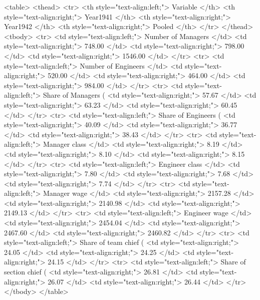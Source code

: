 <table>
 <thead>
  <tr>
   <th style="text-align:left;"> Variable </th>
   <th style="text-align:right;"> Year1941 </th>
   <th style="text-align:right;"> Year1942 </th>
   <th style="text-align:right;"> Pooled </th>
  </tr>
 </thead>
<tbody>
  <tr>
   <td style="text-align:left;"> Number of Managers </td>
   <td style="text-align:right;"> 748.00 </td>
   <td style="text-align:right;"> 798.00 </td>
   <td style="text-align:right;"> 1546.00 </td>
  </tr>
  <tr>
   <td style="text-align:left;"> Number of Engineers </td>
   <td style="text-align:right;"> 520.00 </td>
   <td style="text-align:right;"> 464.00 </td>
   <td style="text-align:right;"> 984.00 </td>
  </tr>
  <tr>
   <td style="text-align:left;"> Share of Managers (%
   <td style="text-align:right;"> 57.67 </td>
   <td style="text-align:right;"> 63.23 </td>
   <td style="text-align:right;"> 60.45 </td>
  </tr>
  <tr>
   <td style="text-align:left;"> Share of Engineers (%
   <td style="text-align:right;"> 40.09 </td>
   <td style="text-align:right;"> 36.77 </td>
   <td style="text-align:right;"> 38.43 </td>
  </tr>
  <tr>
   <td style="text-align:left;"> Manager class </td>
   <td style="text-align:right;"> 8.19 </td>
   <td style="text-align:right;"> 8.10 </td>
   <td style="text-align:right;"> 8.15 </td>
  </tr>
  <tr>
   <td style="text-align:left;"> Engineer class </td>
   <td style="text-align:right;"> 7.80 </td>
   <td style="text-align:right;"> 7.68 </td>
   <td style="text-align:right;"> 7.74 </td>
  </tr>
  <tr>
   <td style="text-align:left;"> Manager wage </td>
   <td style="text-align:right;"> 2157.28 </td>
   <td style="text-align:right;"> 2140.98 </td>
   <td style="text-align:right;"> 2149.13 </td>
  </tr>
  <tr>
   <td style="text-align:left;"> Engineer wage </td>
   <td style="text-align:right;"> 2454.04 </td>
   <td style="text-align:right;"> 2467.60 </td>
   <td style="text-align:right;"> 2460.82 </td>
  </tr>
  <tr>
  <td style="text-align:left;"> Share of team chief (%
   <td style="text-align:right;"> 24.05 </td>
   <td style="text-align:right;"> 24.25 </td>
   <td style="text-align:right;"> 24.15 </td>
  </tr>
  <tr>
  <td style="text-align:left;"> Share of section chief (%
   <td style="text-align:right;"> 26.81 </td>
   <td style="text-align:right;"> 26.07 </td>
   <td style="text-align:right;"> 26.44 </td>
  </tr>
</tbody>
</table>
